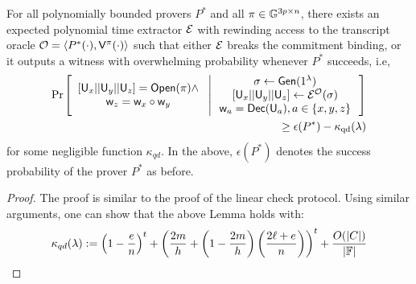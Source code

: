 

\begin{lemma}[Soundness]\label{lem:quadcheck_sound}
For all polynomially bounded provers $P^\ast$ and all $\pi\in \mathbb{G}^{3p\times n}$,
there exists an expected polynomial time extractor $\mathcal{E}$ with rewinding access
to the transcript oracle $\mathcal{O}=\langle P^\ast(\cdot),\mathsf{V}^{\pi}(\cdot)\rangle$
such that either $\mathcal{E}$ breaks the commitment binding, or it outputs a witness
with overwhelming probability whenever $P^\ast$ succeeds, i.e,
{\small
\begin{align*}
\condprob{
\begin{array}{c}
{[}\ewit_x||\ewit_y||\ewit_z{]}=\open(\pi)\wedge \\
\wit_z=\wit_x\circ\wit_y
\end{array}
}{
\begin{array}{c}
\sigma %
\leftarrow \gen(\secparam) \\
{[}\ewit_x||\ewit_y||\ewit_z{]}%
\leftarrow \extr^{\mc{O}}(\sigma) \\ 
\wit_a=\dec(\ewit_a), a\in \{x,y,z\}
\end{array}
}\\
\geq \epsilon(P^\ast) - \kappa_{\rm qd}(\secpar)
\end{align*}
}
for some negligible function $\kappa_{qd}$. In the above, $\epsilon(P^\ast)$
denotes the success probability of the prover $P^\ast$ as before.
\end{lemma}
\begin{proof}
The proof is similar to the proof of the linear check protocol. Using similar
arguments, one can show that the above Lemma holds with:
{\small
\begin{equation*}
\kappa_{qd}(\lambda) := \left(1-\frac{e}{n}\right)^t +
\left(\frac{2m}{h}+\left(1-\frac{2m}{h}\right)\left(\frac{2\ell+e}{n}\right)\right)^t
+ \frac{O(|C|)}{|\mathbb{F}|}
\end{equation*}
}
\end{proof}

